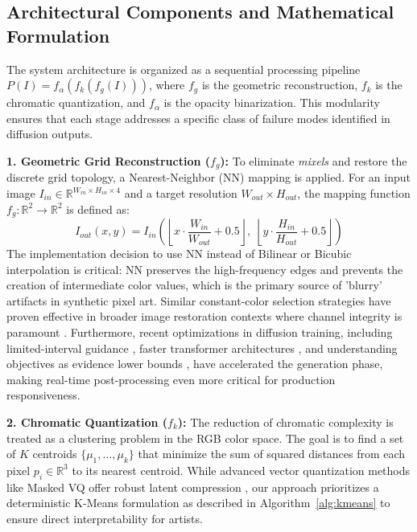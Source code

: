 \documentclass[runningheads]{llncs}
\begin{document}
\subsection{Architectural Components and Mathematical Formulation}

The system architecture is organized as a sequential processing pipeline $P(I) = f_{\alpha}(f_{k}(f_{g}(I)))$, where $f_{g}$ is the geometric reconstruction, $f_{k}$ is the chromatic quantization, and $f_{\alpha}$ is the opacity binarization. This modularity ensures that each stage addresses a specific class of failure modes identified in diffusion outputs.

\textbf{1. Geometric Grid Reconstruction ($f_{g}$):}
To eliminate \textit{mixels} and restore the discrete grid topology, a Nearest-Neighbor (NN) mapping is applied. For an input image $I_{in} \in \mathbb{R}^{W_{in} \times H_{in} \times 4}$ and a target resolution $W_{out} \times H_{out}$, the mapping function $f_{g}: \mathbb{R}^2 \to \mathbb{R}^2$ is defined as:
\begin{equation}
I_{out}(x,y) = I_{in}\!\left(\left\lfloor x \cdot \frac{W_{in}}{W_{out}} + 0.5 \right\rfloor,\; \left\lfloor y \cdot \frac{H_{in}}{H_{out}} + 0.5 \right\rfloor\right)
\end{equation}
The implementation decision to use NN instead of Bilinear or Bicubic interpolation is critical: NN preserves the high-frequency edges and prevents the creation of intermediate color values, which is the primary source of 'blurry' artifacts in synthetic pixel art. Similar constant-color selection strategies have proven effective in broader image restoration contexts where channel integrity is paramount \cite{li2025scalable}. Furthermore, recent optimizations in diffusion training, including limited-interval guidance \cite{aila2024applying}, faster transformer architectures \cite{liu2024fasterdit,ge2024exploring}, and understanding objectives as evidence lower bounds \cite{gao2023understanding}, have accelerated the generation phase, making real-time post-processing even more critical for production responsiveness.

\textbf{2. Chromatic Quantization ($f_{k}$):}
The reduction of chromatic complexity is treated as a clustering problem in the RGB color space. The goal is to find a set of $K$ centroids $\{\mu_1, \dots, \mu_k\}$ that minimize the sum of squared distances from each pixel $p_i \in \mathbb{R}^3$ to its nearest centroid. While advanced vector quantization methods like Masked VQ offer robust latent compression \cite{nguyen2023masked}, our approach prioritizes a deterministic K-Means formulation as described in Algorithm~\ref{alg:kmeans} to ensure direct interpretability for artists.
\end{document}
